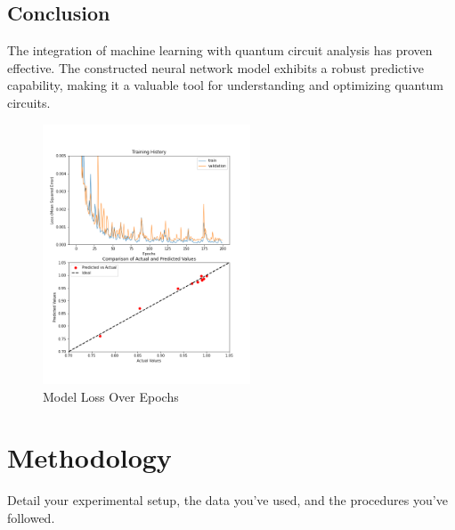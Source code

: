 \documentclass{article}
\begin{document}
\begin{multicols}{2}
\subsection{Conclusion}

    The integration of machine learning with quantum circuit analysis has proven effective. The constructed neural network model exhibits a robust predictive capability, making it a valuable tool for understanding and optimizing quantum circuits.
    
\vspace{-1.70cm}  %
\begin{figure}[H]
        \centering
        \includegraphics[width=0.55\textwidth]{../combined_plots.png}
        \captionsetup{skip=5pt}  %
        \caption{Model Loss Over Epochs}
        \label{fig: Model Loss Over Epochs}
\end{figure}
    
    



\section{Methodology}
Detail your experimental setup, the data you've used, and the procedures you've followed.


\end{multicols}
\end{document}

